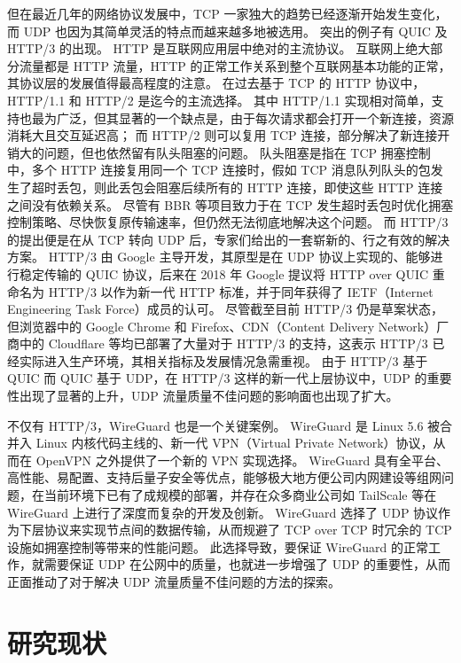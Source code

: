 但在最近几年的网络协议发展中，TCP 一家独大的趋势已经逐渐开始发生变化，而 UDP 也因为其简单灵活的特点而越来越多地被选用。
突出的例子有 QUIC 及 HTTP/3 的出现。
HTTP 是互联网应用层中绝对的主流协议。
互联网上绝大部分流量都是 HTTP 流量，HTTP 的正常工作关系到整个互联网基本功能的正常，其协议层的发展值得最高程度的注意。
在过去基于 TCP 的 HTTP 协议中，HTTP/1.1 和 HTTP/2 是迄今的主流选择。
其中 HTTP/1.1 实现相对简单，支持也最为广泛，但其显著的一个缺点是，由于每次请求都会打开一个新连接，资源消耗大且交互延迟高；
而 HTTP/2 则可以复用 TCP 连接，部分解决了新连接开销大的问题，但也依然留有队头阻塞的问题。
队头阻塞是指在 TCP 拥塞控制中，多个 HTTP 连接复用同一个 TCP 连接时，假如 TCP 消息队列队头的包发生了超时丢包，则此丢包会阻塞后续所有的 HTTP 连接，即使这些 HTTP 连接之间没有依赖关系。
尽管有 BBR\cite{45646} 等项目致力于在 TCP 发生超时丢包时优化拥塞控制策略、尽快恢复原传输速率，但仍然无法彻底地解决这个问题。
而 HTTP/3 的提出便是在从 TCP 转向 UDP 后，专家们给出的一套崭新的、行之有效的解决方案\cite{7997281,10.1145/2695664.2695706}。
HTTP/3 由 Google 主导开发，其原型是在 UDP 协议上实现的、能够进行稳定传输的 QUIC\cite{10.1145/3098822.3098842} 协议，后来在 2018 年 Google 提议将 HTTP over QUIC 重命名为 HTTP/3 以作为新一代 HTTP 标准，并于同年获得了 IETF（Internet Engineering Task Force）成员的认可。
尽管截至目前 HTTP/3 仍是草案状态\cite{ietf-quic-http-34}，但浏览器中的 Google Chrome 和 Firefox、CDN（Content Delivery Network）厂商中的 Cloudflare 等均已部署了大量对于 HTTP/3 的支持，这表示 HTTP/3 已经实际进入生产环境，其相关指标及发展情况急需重视。
由于 HTTP/3 基于 QUIC 而 QUIC 基于 UDP，在 HTTP/3 这样的新一代上层协议中，UDP 的重要性出现了显著的上升，UDP 流量质量不佳问题的影响面也出现了扩大。

不仅有 HTTP/3，WireGuard 也是一个关键案例。
WireGuard\cite{donenfeld2017wireguard} 是 Linux 5.6 被合并入 Linux 内核代码主线的、新一代 VPN（Virtual Private Network）协议，从而在 OpenVPN 之外提供了一个新的 VPN 实现选择。
WireGuard 具有全平台、高性能、易配置、支持后量子安全\cite{9519445}等优点，能够极大地方便公司内网建设等组网问题，在当前环境下已有了成规模的部署，并存在众多商业公司如 TailScale 等在 WireGuard 上进行了深度而复杂的开发及创新。
WireGuard 选择了 UDP 协议作为下层协议来实现节点间的数据传输，从而规避了 TCP over TCP 时冗余的 TCP 设施如拥塞控制等带来的性能问题。
此选择导致，要保证 WireGuard 的正常工作，就需要保证 UDP 在公网中的质量，也就进一步增强了 UDP 的重要性，从而正面推动了对于解决 UDP 流量质量不佳问题的方法的探索。

\section{研究现状}

